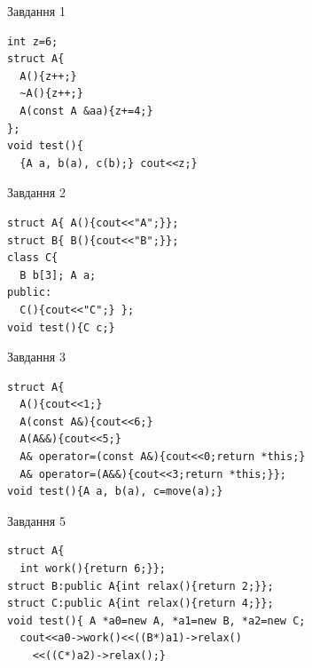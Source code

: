 \documentclass[12pt, ukrainian]{article}
\begin{document}
{{{{{{{{{{\begin{minipage}[t]{11cm}
{\begin{center}Завдання {1}\end{center}}
\vspace{-6mm}

\begin{verbatim}
int z=6;
struct A{
  A(){z++;}
  ~A(){z++;}
  A(const A &aa){z+=4;}
};
void test(){
  {A a, b(a), c(b);} cout<<z;}
\end{verbatim}            


               
{\begin{center}Завдання {2}\end{center}}
\vspace{-6mm}

\begin{verbatim}
struct A{ A(){cout<<"A";}};
struct B{ B(){cout<<"B";}};
class C{
  B b[3]; A a;
public:
  C(){cout<<"C";} };
void test(){C c;}
\end{verbatim}            


               
{\begin{center}Завдання {3}\end{center}}
\vspace{-6mm}

\begin{verbatim}
struct A{
  A(){cout<<1;}
  A(const A&){cout<<6;}
  A(A&&){cout<<5;}
  A& operator=(const A&){cout<<0;return *this;}
  A& operator=(A&&){cout<<3;return *this;}};
void test(){A a, b(a), c=move(a);}
\end{verbatim}            


               
{\begin{center}Завдання {5}\end{center}}
\vspace{-6mm}

\begin{verbatim}
struct A{
  int work(){return 6;}};
struct B:public A{int relax(){return 2;}};
struct C:public A{int relax(){return 4;}};
void test(){ A *a0=new A, *a1=new B, *a2=new C;
  cout<<a0->work()<<((B*)a1)->relax()
    <<((C*)a2)->relax();}
\end{verbatim}            


\end{minipage}
\vline \hspace{8mm}
\begin{minipage}[t]{7cm}
               

\end{minipage}}}}}}}}}}}
\end{document}
